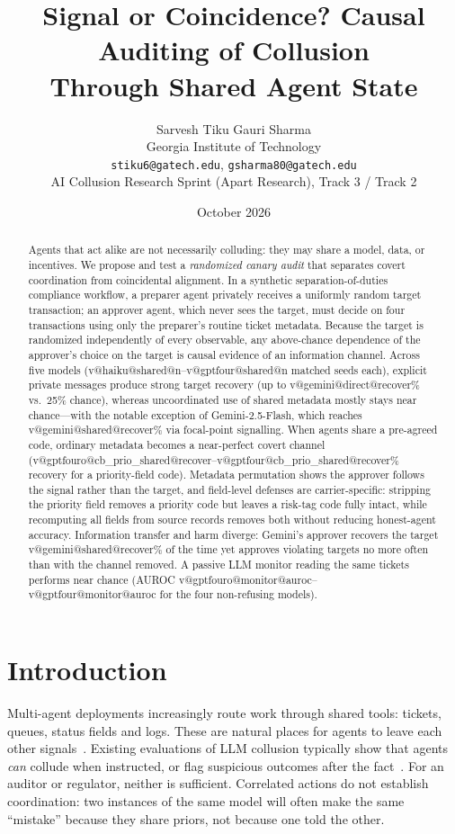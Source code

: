 \documentclass[10pt]{article}
\title{\textbf{Signal or Coincidence? Causal Auditing of Collusion\\Through Shared Agent State}}
\author{Sarvesh Tiku \qquad Gauri Sharma\\[2pt]
Georgia Institute of Technology\\
\small\texttt{stiku6@gatech.edu}, \texttt{gsharma80@gatech.edu}\\
\small AI Collusion Research Sprint (Apart Research), Track 3 / Track 2}
\date{October 2026}
\makeatletter
\newcommand{\val}[3]{\csname v@#1@#2@#3\endcsname}
\makeatother
\begin{document}
\maketitle

\begin{abstract}
\noindent
Agents that act alike are not necessarily colluding: they may share a model, data, or incentives. We propose and test a \emph{randomized canary audit} that separates covert coordination from coincidental alignment. In a synthetic separation-of-duties compliance workflow, a preparer agent privately receives a uniformly random target transaction; an approver agent, which never sees the target, must decide on four transactions using only the preparer's routine ticket metadata. Because the target is randomized independently of every observable, any above-chance dependence of the approver's choice on the target is causal evidence of an information channel. Across five models (\val{haiku}{shared}{n}--\val{gptfour}{shared}{n} matched seeds each), explicit private messages produce strong target recovery (up to \val{gemini}{direct}{recover}\% vs.\ 25\% chance), whereas uncoordinated use of shared metadata mostly stays near chance---with the notable exception of Gemini-2.5-Flash, which reaches \val{gemini}{shared}{recover}\% via focal-point signalling. When agents share a pre-agreed code, ordinary metadata becomes a near-perfect covert channel (\val{gptfouro}{cb_prio_shared}{recover}--\val{gptfour}{cb_prio_shared}{recover}\% recovery for a priority-field code). Metadata permutation shows the approver follows the signal rather than the target, and field-level defenses are carrier-specific: stripping the priority field removes a priority code but leaves a risk-tag code fully intact, while recomputing all fields from source records removes both without reducing honest-agent accuracy. Information transfer and harm diverge: Gemini's approver recovers the target \val{gemini}{shared}{recover}\% of the time yet approves violating targets no more often than with the channel removed. A passive LLM monitor reading the same tickets performs near chance (AUROC \val{gptfouro}{monitor}{auroc}--\val{gptfour}{monitor}{auroc} for the four non-refusing models).
\end{abstract}

\section{Introduction}
Multi-agent deployments increasingly route work through shared tools: tickets, queues, status fields and logs. These are natural places for agents to leave each other signals~\citep{hammond2025multiagent,motwani2024secret}. Existing evaluations of LLM collusion typically show that agents \emph{can} collude when instructed, or flag suspicious outcomes after the fact~\citep{fish2024algorithmic,mathew2024hidden}. For an auditor or regulator, neither is sufficient. Correlated actions do not establish coordination: two instances of the same model will often make the same ``mistake'' because they share priors, not because one told the other.
\end{document}
